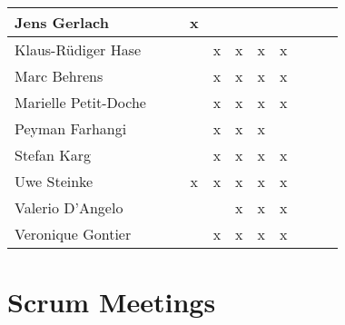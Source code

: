 \documentclass[a4paper, 11pt]{article}
\begin{document}
\begin{tabular}{|l|c|c|c|c||c|c|c||c|c|c|}
Jens Gerlach         &   &   & x &  &  &   &   \\\hline
Klaus-R\"udiger Hase &   &   &  & x & x & x & x \\\hline
Marc Behrens         &    &   &  & x & x & x & x \\\hline
Marielle Petit-Doche &   &   &   & x & x & x & x \\\hline
Peyman Farhangi      &   &   &  & x & x & x &   \\\hline
Stefan Karg          &   &  &  & x & x & x & x \\\hline
Uwe Steinke          &   &  & x & x & x & x & x \\\hline
Valerio D'Angelo     &   &   &   &   & x & x & x \\\hline
Veronique Gontier    &   &   &  & x & x & x & x \\\hline
\end{tabular}


\section{Scrum Meetings}
\end{document}
